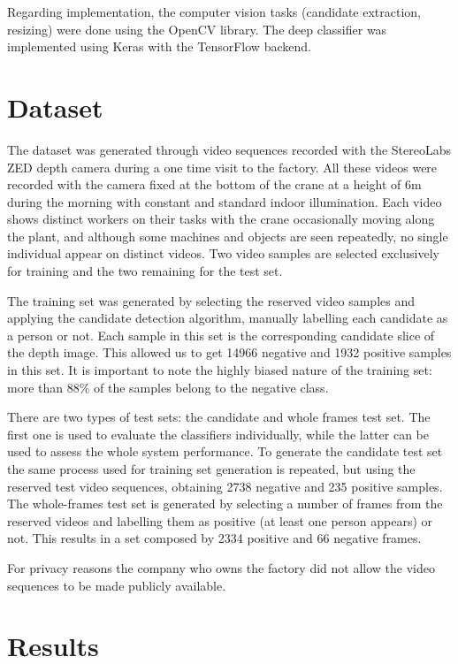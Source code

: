         Regarding implementation, the computer vision tasks (candidate extraction, resizing) were done using the OpenCV library. The deep classifier was implemented using Keras \cite{keras} with the TensorFlow \cite{tensorflow2015-whitepaper} backend.

\section{Dataset}
\label{sec:dataset}
The dataset was generated through video sequences recorded with the StereoLabs ZED depth camera during a one time visit to the factory. All these videos were recorded with the camera fixed at the bottom of the crane at a height of 6m during the morning with constant and standard indoor illumination. Each video shows distinct workers on their tasks with the crane occasionally moving along the plant, and although some machines and objects are seen repeatedly, no single individual appear on distinct videos. Two video samples are selected exclusively for training and the two remaining for the test set.

The training set was generated by selecting the reserved video samples and applying the candidate detection algorithm, manually labelling each candidate as a person or not. Each sample in this set is the corresponding candidate slice of the depth image. This allowed us to get 14966 negative and 1932 positive samples in this set. It is important to note the highly biased nature of the training set: more than 88\% of the samples belong to the negative class.

There are two types of test sets: the candidate and whole frames test set. The first one is used to evaluate the classifiers individually, while the latter can be used to assess the whole system performance. To generate the candidate test set the same process used for training set generation is repeated, but using the reserved test video sequences, obtaining 2738 negative and 235 positive samples. The whole-frames test set is generated by selecting a number of frames from the reserved videos and labelling them as positive (at least one person appears) or not. This results in a set composed by 2334 positive and 66 negative frames.

For privacy reasons the company who owns the factory did not allow the video sequences to be made publicly available.

\section{Results}
\label{sec:results}

